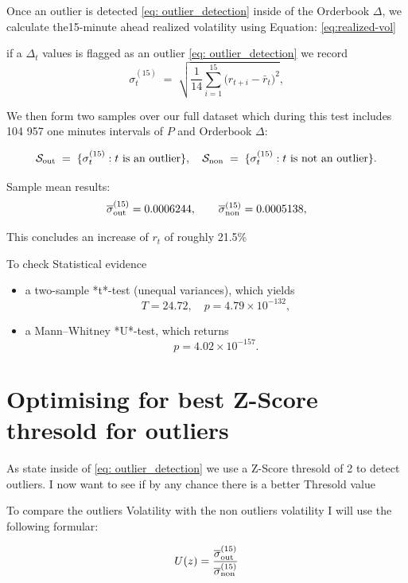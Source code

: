 \documentclass[12pt]{article}
\begin{document}
Once an outlier is detected \eqref{eq: outlier_detection} inside of the Orderbook $\Delta$, we calculate the15-minute ahead realized volatility using Equation: \eqref{eq:realized-vol}




if a $\Delta_t$ values is flagged as an outlier \eqref{eq: outlier_detection}
we record
$$
\sigma^{(15)}_t
\;=\;
\sqrt{\frac{1}{14}\sum_{i=1}^{15}\bigl(r_{t+i}-\bar r_{t}\bigr)^{2}},
$$

We then form two samples over our full dataset which during this test includes 104 957 one minutes intervals of $P$ and Orderbook $\Delta$:


$$
\mathcal{S}_{\rm out} \;=\;\{\sigma^{(15)}_t : t\text{ is an outlier}\},
\quad
\mathcal{S}_{\rm non} \;=\;\{\sigma^{(15)}_t : t\text{ is not an outlier}\}.
$$


Sample mean results:
$$
\overline{\sigma}^{(15)}_{\rm out}
=0.0006244,
\qquad
\overline{\sigma}^{(15)}_{\rm non}
=0.0005138,
$$




This concludes an increase of $r_t$ of roughly 21.5\%


To check Statistical evidence

\begin{itemize}
  \item a two-sample *t*-test (unequal variances), which yields
  $$
    T=24.72,\quad p=4.79\times10^{-132},
  $$
  \item a Mann–Whitney *U*-test, which returns
  $$
    p=4.02\times10^{-157}.
  $$
\end{itemize}


\newpage

\section{Optimising for best Z-Score thresold for outliers}

As state inside of \eqref{eq: outlier_detection} we use a Z-Score thresold of 2 to detect outliers. I now want to 
see if by any chance there is a better Thresold value  

To compare the outliers Volatility with the non outliers volatility I will use the following formular:

\begin{equation}\label{eq:vol_ratio}
U(z) =\frac{ \overline{\sigma}^{(15)}_{\rm out}}{\overline{\sigma}^{(15)}_{\rm non}}
\end{equation}
\end{document}
